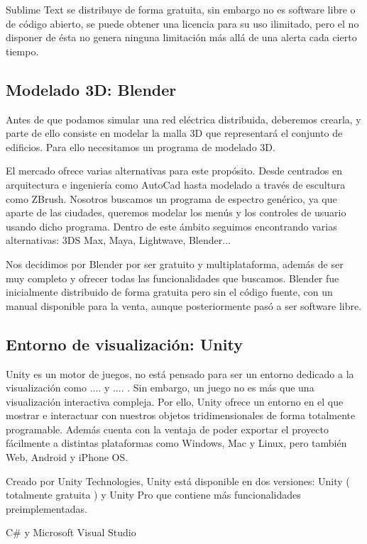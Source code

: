 \documentclass[12pt,a4paper,openright,oneside]{article}
\numberwithin{equation}{section}
\theoremstyle{definition}
\begin{document}
Sublime Text se distribuye de forma gratuita, sin embargo no es software libre o de código abierto, se puede obtener una licencia para su uso ilimitado, pero el no disponer de ésta no genera ninguna limitación más allá de una alerta cada cierto tiempo.

\subsection{Modelado 3D: Blender}

Antes de que podamos simular una red eléctrica distribuida, deberemos crearla, y parte de ello consiste en modelar la malla 3D que representará el conjunto de edificios. Para ello necesitamos un programa de modelado 3D. 

El mercado ofrece varias alternativas para este propósito. Desde centrados en arquitectura e ingeniería como AutoCad hasta modelado a través de escultura como ZBrush. Nosotros buscamos un programa de espectro genérico, ya que aparte de las ciudades, queremos modelar los menús y los controles de usuario usando dicho programa. Dentro de este ámbito seguimos encontrando varias alternativas: 3DS Max, Maya, Lightwave, Blender... 

Nos decidimos por Blender por ser gratuito y multiplataforma, además de ser muy completo y ofrecer todas las funcionalidades que buscamos.
Blender fue inicialmente distribuido de forma gratuita pero sin el código fuente, con un manual disponible para la venta, aunque posteriormente pasó a ser software libre. 

\subsection{Entorno de visualización: Unity}

Unity es un motor de juegos, no está pensado para ser un entorno dedicado a la visualización como .... y .... . Sin embargo, un juego no es más que una visualización interactiva compleja. Por ello, Unity ofrece un entorno en el que mostrar e interactuar con nuestros objetos tridimensionales de forma totalmente programable. Además cuenta con la ventaja de poder exportar el proyecto fácilmente a distintas plataformas como Windows, Mac y Linux, pero también Web, Android y iPhone OS.

Creado por Unity Technologies, Unity está disponible en dos versiones: Unity ( totalmente gratuita ) y Unity Pro que contiene más funcionalidades preimplementadas.

C\# y Microsoft Visual Studio
\end{document}
